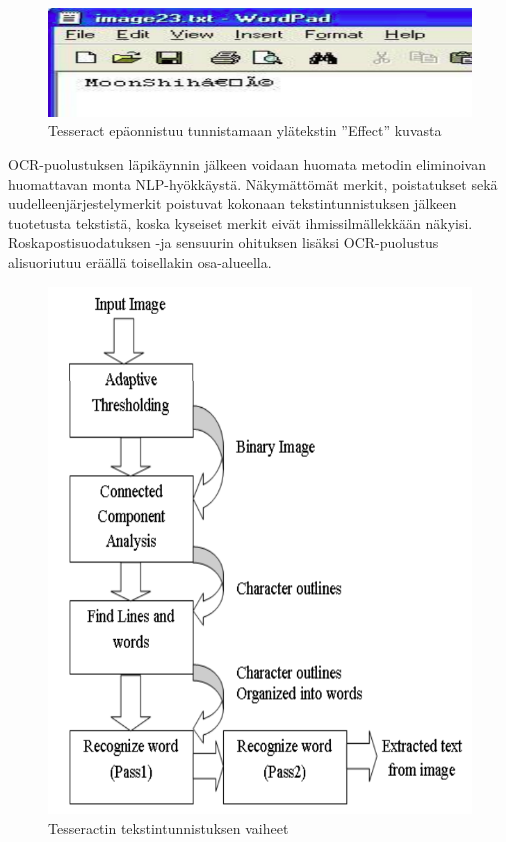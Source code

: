 \begin{figure}[t]
  \includegraphics[scale=0.6]{figures/failmoonshine.png}
  \caption{Tesseract epäonnistuu tunnistamaan ylätekstin ''Effect'' kuvasta \citep{tesseractocr}}
\end{figure}

OCR-puolustuksen läpikäynnin jälkeen voidaan huomata metodin eliminoivan huomattavan monta NLP-hyökkäystä. Näkymättömät merkit, poistatukset sekä uudelleenjärjestelymerkit poistuvat kokonaan tekstintunnistuksen jälkeen tuotetusta tekstistä, koska kyseiset merkit eivät ihmissilmällekkään näkyisi. Roskapostisuodatuksen -ja sensuurin ohituksen lisäksi OCR-puolustus alisuoriutuu eräällä toisellakin osa-alueella.

\begin{figure}[t]
  \includegraphics[scale=0.4]{figures/tesseract.png}
  \caption{Tesseractin tekstintunnistuksen vaiheet \citep{tesseractocr}}
\end{figure}

